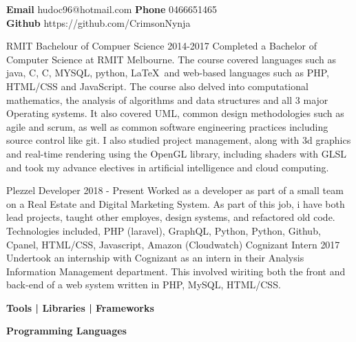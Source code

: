 \documentclass[9pt]{developercv}
\newcommand{\CC}{C\nolinebreak\hspace{-.05em}\raisebox{.4ex}{\tiny\bf +}\nolinebreak\hspace{-.10em}\raisebox{.4ex}{\tiny\bf +}}
\def\CC{{C\nolinebreak[4]\hspace{-.05em}\raisebox{.4ex}{\tiny\bf ++}}}
\begin{document}
\begin{minipage}[t]{0.65\textwidth}

\begin{center}
	\textbf {Email} hudoc96@hotmail.com
	\textbf {Phone} 0466651465 \\
	\textbf {Github} https://github.com/CrimsonNynja \\
\end{center}

\begin{entrylist}
	\entry
		{RMIT}
		{Bachelour of Compuer Science}
		{2014-2017}
		{Completed a Bachelor of Computer Science at RMIT Melbourne. The course covered languages such as java, C, \CC, MYSQL, python, \LaTeX  \  and web-based languages such as PHP, HTML/CSS and JavaScript. The course also delved into computational mathematics, the analysis of algorithms and data structures and all 3 major Operating systems. It also covered UML, common design methodologies such as agile and scrum, as well as common software engineering practices including source control like git. I also studied project management, along with 3d graphics and real-time rendering using the OpenGL library, including shaders with GLSL and took my advance electives in artificial intelligence and cloud computing.}
\end{entrylist}

\begin{entrylist}
	\entry
		{Plezzel}
		{Developer}
		{2018 - Present}
		{Worked as a developer as part of a small team on a Real Estate and Digital Marketing System. As part of this job, i have both lead projects, taught other employes, design systems, and refactored old code. Technologies included, PHP (laravel), GraphQL, Python, Python, Github, Cpanel, HTML/CSS, Javascript, Amazon (Cloudwatch)}
	\entry
		{Cognizant}
		{Intern}
		{2017}
		{Undertook an internship with Cognizant as an intern in their Analysis Information Management department. This involved wiriting both the front and back-end of a web system written in PHP, MySQL, HTML/CSS.}
\end{entrylist}	


\begin{center}
\textbf{Tools | Libraries | Frameworks}\\


\textbf{Programming Languages}\\
\begin{barchart}{5.5}
		\baritem{\CC}{100}
	\end{barchart}
\end{center}

\end{minipage}
\end{document}
